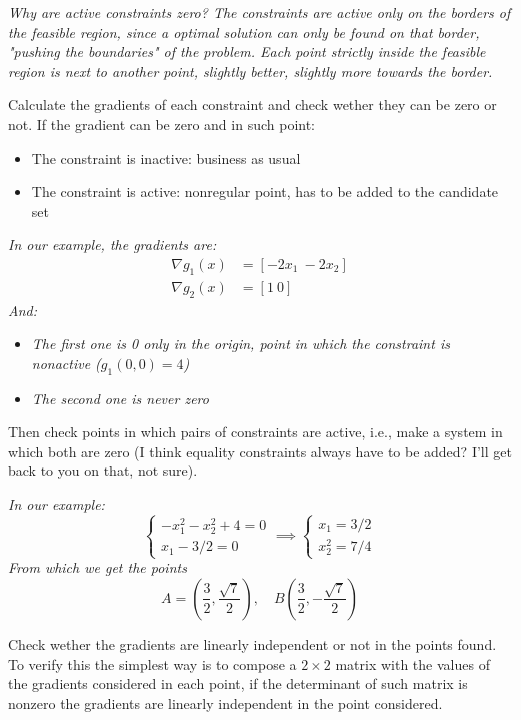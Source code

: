 \textit{Why are active constraints zero? The constraints are active only on the borders of the feasible region, since a optimal solution can only be found on that border, "pushing the boundaries" of the problem. Each point strictly inside the feasible region is next to another point, slightly better, slightly more towards the border.}

Calculate the gradients of each constraint and check wether they can be zero or not. If the gradient can be zero and in such point: 
\begin{itemize}
	\item The constraint is inactive: business as usual
	
	\item The constraint is active: nonregular point, has to be added to the candidate set
\end{itemize}

\textit{In our example, the gradients are: 
\begin{align*}
	\nabla g_1 (x) & = \left[ - 2 x_1 \  - 2 x_2 \right] \\
	\nabla g_2 (x) & = \left[ 1 \ 0 \right]
\end{align*}
And:}
\begin{itemize}
	\item \textit{The first one is 0 only in the origin, point in which the constraint is nonactive ($ g_1 (0,0) = 4 $)}
	
	\item \textit{The second one is never zero}
\end{itemize}

Then check points in which pairs of constraints are active, i.e., make a system in which both are zero (I think equality constraints always have to be added? I'll get back to you on that, not sure).

\textit{In our example:
$$
\begin{cases}
	-x_1^2 - x_2^2 + 4 = 0 \\
	x_1 - 3/2 = 0 
\end{cases}
\implies
\begin{cases}
	x_1 = 3/2 \\
	x_2^2 = 7/4
\end{cases}
$$
From which we get the points
$$ A = \left(\frac{3}{2}, \frac{\sqrt{7}}{2}\right), \quad B \left(\frac{3}{2}, - \frac{\sqrt{7}}{2}\right) $$}

Check wether the gradients are linearly independent or not in the points found. To verify this the simplest way is to compose a $2 \times 2$ matrix with the values of the gradients considered in each point, if the determinant of such matrix is nonzero the gradients are linearly independent in the point considered.


